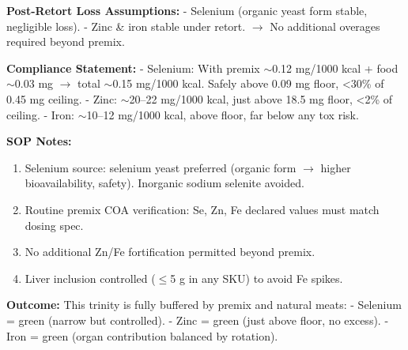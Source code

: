 \textbf{Post-Retort Loss Assumptions:}  
- Selenium (organic yeast form stable, negligible loss).  
- Zinc \& iron stable under retort.  
$\rightarrow$ No additional overages required beyond premix.  

\textbf{Compliance Statement:}  
- Selenium: With premix $\sim$0.12 mg/1000 kcal + food $\sim$0.03 mg $\rightarrow$ total $\sim$0.15 mg/1000 kcal. Safely above 0.09 mg floor, <30\% of 0.45 mg ceiling.  
- Zinc: $\sim$20--22 mg/1000 kcal, just above 18.5 mg floor, <2\% of ceiling.  
- Iron: $\sim$10--12 mg/1000 kcal, above floor, far below any tox risk.  

\textbf{SOP Notes:}  
\begin{enumerate}[leftmargin=1.2em]
  \item Selenium source: selenium yeast preferred (organic form $\rightarrow$ higher bioavailability, safety). Inorganic sodium selenite avoided.  
  \item Routine premix COA verification: Se, Zn, Fe declared values must match dosing spec.  
  \item No additional Zn/Fe fortification permitted beyond premix.  
  \item Liver inclusion controlled ($\leq$5 g in any SKU) to avoid Fe spikes.  
\end{enumerate}

\textbf{Outcome:}  
This trinity is fully buffered by premix and natural meats:  
- Selenium = green (narrow but controlled).  
- Zinc = green (just above floor, no excess).  
- Iron = green (organ contribution balanced by rotation).
